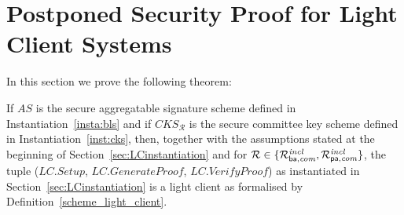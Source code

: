 \section{Postponed Security Proof for Light Client Systems}
\label{supplementary_proof_sec_soundness}

\noindent In this section we prove the following theorem:

\begin{theorem} 
\label{thm_lc_soundness}
If $\mathit{AS}$ is the secure aggregatable signature scheme defined in Instantiation~\ref{insta:bls} and if 
$\mathit{CKS_{\mathcal{R}}}$ is the secure committee key scheme defined in Instantiation~\ref{inst:cks}, 
then, together with the assumptions stated at the beginning of Section~\ref{sec:LCinstantiation} and for 
$\mathcal{R} \in \{ \mathcal{R}^{\mathit{incl}}_{\mathsf{ba},\mathit{com}}, \mathcal{R}^{\mathit{incl}}_{\mathsf{pa},\mathit{com}} \}$, the tuple ($\mathit{LC.Setup}$, $\mathit{LC.GenerateProof}$, $\mathit{LC.VerifyProof}$) 
as instantiated in Section~\ref{sec:LCinstantiation} is a light client  as formalised by Definition~\ref{scheme_light_client}.
\end{theorem}

